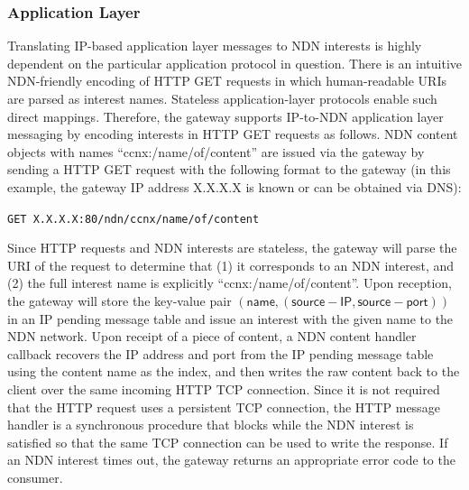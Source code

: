 \subsubsection{Application Layer}
Translating IP-based application layer messages to NDN interests is highly dependent on the particular application protocol in question. There is an intuitive NDN-friendly encoding of HTTP GET requests in which human-readable URIs are parsed as interest names. Stateless application-layer protocols enable such direct mappings. Therefore, the gateway supports IP-to-NDN application layer messaging by encoding interests in HTTP GET requests as follows. NDN content objects with names ``ccnx:/name/of/content'' are issued via the gateway by sending a HTTP GET request with the following format to the gateway (in this example, the gateway IP address X.X.X.X is known or can be obtained via DNS):
\begin{center}
{\tt GET X.X.X.X:80/ndn/ccnx/name/of/content}
\end{center}
Since HTTP requests and NDN interests are stateless, the gateway will parse the URI of the request to determine that (1) it corresponds to an NDN interest, and (2) the full interest name is explicitly ``ccnx:/name/of/content''. Upon reception, the gateway will store the key-value pair $(\mathsf{name}, (\mathsf{source-IP}, \mathsf{source-port}))$ in an IP pending message table and issue an interest with the given name to the NDN network. Upon receipt of a piece of content, a NDN content handler callback recovers the IP address and port from the IP pending message table using the content name as the index, and then writes the raw content back to the client over the same incoming HTTP TCP connection. Since it is not required that the HTTP request uses a persistent TCP connection, the HTTP message handler is a synchronous procedure that blocks while the NDN interest is satisfied so that the same TCP connection can be used to write the response. If an NDN interest times out, the gateway returns an appropriate error code to the consumer.

